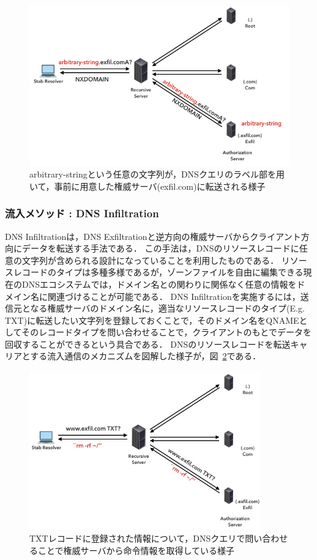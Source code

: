 \begin{figure}[h]
 \centering
 \includegraphics[width=12.0cm]{figure/dns-exfiltration.png}
 \caption{arbitrary-stringという任意の文字列が，DNSクエリのラベル部を用いて，事前に用意した権威サーバ(exfil.com)に転送される様子}
 \label{fig:dns-exfiltration}
\end{figure}


\subsubsection{流入メソッド : DNS Infiltration}
\label{sec:dns-infiltration}
DNS Infiltrationは，DNS Exfiltrationと逆方向の権威サーバからクライアント方向にデータを転送する手法である．
この手法は，DNSのリソースレコードに任意の文字列が含められる設計になっていることを利用したものである．
リソースレコードのタイプは多種多様であるが，ゾーンファイルを自由に編集できる現在のDNSエコシステムでは，ドメイン名との関わりに関係なく任意の情報をドメイン名に関連づけることが可能である．
DNS Infiltrationを実施するには，送信元となる権威サーバのドメイン名に，適当なリソースレコードのタイプ(E.g. TXT)に転送したい文字列を登録しておくことで，そのドメイン名をQNAMEとしてそのレコードタイプを問い合わせることで，クライアントのもとでデータを回収することができるという具合である．
DNSのリソースレコードを転送キャリアとする流入通信のメカニズムを図解した様子が，図~\ref{fig:dns-infiltration}である．

\begin{figure}[h]
 \centering
 \includegraphics[width=10.0cm]{figure/dns-infiltration.png}
 \caption{TXTレコードに登録された情報について，DNSクエリで問い合わせることで権威サーバから命令情報を取得している様子}
 \label{fig:dns-infiltration}
\end{figure}



